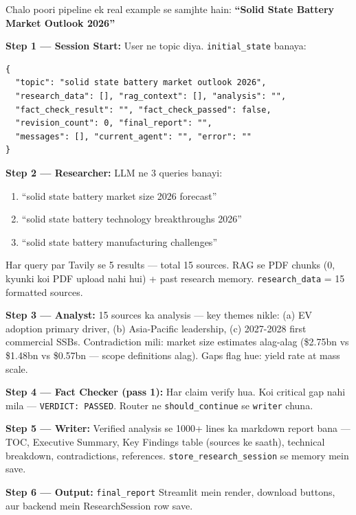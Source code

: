\documentclass[11pt, a4paper]{article}
\begin{document}
\begin{storybox}
Chalo poori pipeline ek real example se samjhte hain: \textbf{``Solid State Battery Market Outlook 2026''}

\textbf{Step 1 --- Session Start:} User ne topic diya. \texttt{initial\_state} banaya:
\begin{lstlisting}[style=jsonstyle]
{
  "topic": "solid state battery market outlook 2026",
  "research_data": [], "rag_context": [], "analysis": "",
  "fact_check_result": "", "fact_check_passed": false,
  "revision_count": 0, "final_report": "",
  "messages": [], "current_agent": "", "error": ""
}
\end{lstlisting}

\textbf{Step 2 --- Researcher:} LLM ne 3 queries banayi:
\begin{enumerate}[label=\textcolor{accentpurple}{\arabic*.}]
\item ``solid state battery market size 2026 forecast''
\item ``solid state battery technology breakthroughs 2026''
\item ``solid state battery manufacturing challenges''
\end{enumerate}
Har query par Tavily se 5 results --- total 15 sources. RAG se PDF chunks (0, kyunki koi PDF upload nahi hui) + past research memory. \texttt{research\_data} = 15 formatted sources.

\textbf{Step 3 --- Analyst:} 15 sources ka analysis --- key themes nikle: (a) EV adoption primary driver, (b) Asia-Pacific leadership, (c) 2027-2028 first commercial SSBs. Contradiction mili: market size estimates alag-alag (\$2.75bn vs \$1.48bn vs \$0.57bn --- scope definitions alag). Gaps flag hue: yield rate at mass scale.

\textbf{Step 4 --- Fact Checker (pass 1):} Har claim verify hua. Koi critical gap nahi mila --- \texttt{VERDICT: PASSED}. Router ne \texttt{should\_continue} se \texttt{writer} chuna.

\textbf{Step 5 --- Writer:} Verified analysis se 1000+ lines ka markdown report bana --- TOC, Executive Summary, Key Findings table (sources ke saath), technical breakdown, contradictions, references. \texttt{store\_research\_session} se memory mein save.

\textbf{Step 6 --- Output:} \texttt{final\_report} Streamlit mein render, download buttons, aur backend mein ResearchSession row save.
\end{storybox}
\end{document}
